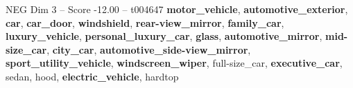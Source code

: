 \begin{textsample}{NEG Dim 3 – Score -12.00 – t004647}  \label{ex:f3_neg_007}
\textbf{motor\_vehicle}, \textbf{automotive\_exterior}, \textbf{car}, \textbf{car\_door}, \textbf{windshield}, \textbf{rear-view\_mirror}, \textbf{family\_car}, \textbf{luxury\_vehicle}, \textbf{personal\_luxury\_car}, \textbf{glass}, \textbf{automotive\_mirror}, \textbf{mid-size\_car}, \textbf{city\_car}, \textbf{automotive\_side-view\_mirror}, \textbf{sport\_utility\_vehicle}, \textbf{windscreen\_wiper}, full-size\_car, \textbf{executive\_car}, sedan, hood, \textbf{electric\_vehicle}, hardtop

\end{textsample}

